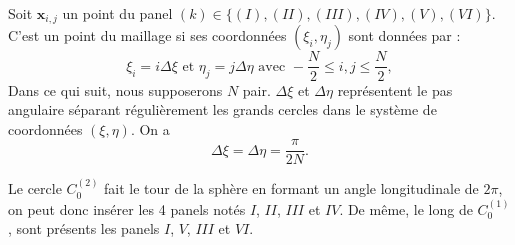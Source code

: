 Soit $\mathbf{x}_{i,j}$ un point du panel $(k) \in \lbrace (I), (II), (III), (IV), (V), (VI) \rbrace$. C'est un point du maillage si ses coordonnées $(\xi_i, \eta_j)$ sont données par :
\begin{equation}
\xi_i = i \Delta \xi \text{ et } \eta_j = j \Delta \eta \text{ avec } -\dfrac{N}{2} \leq i,j \leq \dfrac{N}{2},
\end{equation}
Dans ce qui suit, nous supposerons $N$ pair. $\Delta \xi$ et $\Delta \eta$ représentent le pas angulaire séparant régulièrement les grands cercles dans le système de coordonnées $(\xi, \eta)$. On a
\begin{equation}
\Delta \xi = \Delta \eta = \dfrac{\pi}{2N}.
\end{equation} 













Le cercle $C_0^{(2)}$ fait le tour de la sphère en formant un angle longitudinale de $2 \pi$, on peut donc insérer les 4 panels notés $I$, $II$, $III$ et $IV$. De même, le long de $C_0^{(1)}$, sont présents les panels $I$, $V$, $III$ et $VI$.


